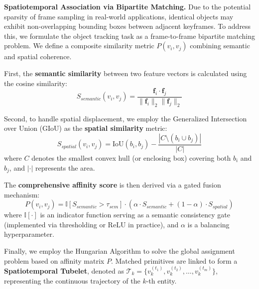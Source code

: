 \textbf{Spatiotemporal Association via Bipartite Matching.}
Due to the potential sparsity of frame sampling in real-world applications, identical objects may exhibit non-overlapping bounding boxes between adjacent keyframes. To address this, we formulate the object tracking task as a frame-to-frame bipartite matching problem. We define a composite similarity metric $P(v_i, v_j)$ combining semantic and spatial coherence.

First, the \textbf{semantic similarity} between two feature vectors is calculated using the cosine similarity:
\begin{equation}
    S_{semantic}(v_i, v_j) = \frac{\mathbf{f}_i \cdot \mathbf{f}_j}{\|\mathbf{f}_i\|_2 \|\mathbf{f}_j\|_2}
\end{equation}

Second, to handle spatial displacement, we employ the Generalized Intersection over Union (GIoU) as the \textbf{spatial similarity} metric:
\begin{equation}
    S_{spatial}(v_i, v_j) = \text{IoU}(b_i, b_j) - \frac{|C \setminus (b_i \cup b_j)|}{|C|}
\end{equation}
where $C$ denotes the smallest convex hull (or enclosing box) covering both $b_i$ and $b_j$, and $|\cdot|$ represents the area.

The \textbf{comprehensive affinity score} is then derived via a gated fusion mechanism:
\begin{equation}
    P(v_i, v_j) = \mathbb{I}[S_{semantic} > \tau_{sem}] \cdot \left( \alpha \cdot S_{semantic} + (1-\alpha) \cdot S_{spatial} \right)
\end{equation}
where $\mathbb{I}[\cdot]$ is an indicator function serving as a semantic consistency gate (implemented via thresholding or ReLU in practice), and $\alpha$ is a balancing hyperparameter.

Finally, we employ the Hungarian Algorithm to solve the global assignment problem based on affinity matrix $P$. Matched primitives are linked to form a \textbf{Spatiotemporal Tubelet}, denoted as $\mathcal{T}_k = \{v_k^{(t_1)}, v_k^{(t_2)}, \dots, v_k^{(t_m)}\}$, representing the continuous trajectory of the $k$-th entity.

